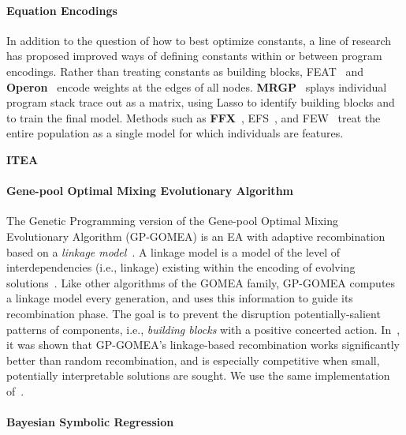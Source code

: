 \paragraph{Equation Encodings}

In addition to the question of how to best optimize constants, a line of research has proposed improved ways of defining constants within or between program encodings. 
Rather than treating constants as building blocks, FEAT~\cite{lacavaLearningConciseRepresentations2019c} and \textbf{Operon}~\cite{burlacuOperonEfficientGenetic2020} encode weights at the edges of all nodes. 
\textbf{MRGP}~\cite{arnaldoMultipleRegressionGenetic2014a} splays individual program stack trace out as a matrix, using Lasso to identify building blocks and to train the final model.
Methods such as \textbf{FFX}~\cite{mcconaghyFFXFastScalable2011}, EFS~\cite{arnaldoBuildingPredictiveModels2015}, and FEW~\cite{lacavaGeneralFeatureEngineering2017} treat the entire population as a single model for which individuals are features.

\textbf{ITEA}

\paragraph{Gene-pool Optimal Mixing Evolutionary Algorithm}

The Genetic Programming version of the Gene-pool Optimal Mixing Evolutionary Algorithm (GP-GOMEA) is an EA with adaptive recombination based on a \emph{linkage model}~\cite{virgolin2017scalable,virgolin2020improving}. 
A linkage model is a model of the level of interdependencies (i.e., linkage) existing within the encoding of evolving solutions~\cite{thierens2011optimal}. 
Like other algorithms of the GOMEA family, GP-GOMEA computes a linkage model every generation, and uses this information to guide its recombination phase. 
The goal is to prevent the disruption potentially-salient patterns of components, i.e., \emph{building blocks} with a positive concerted action.
In~\cite{virgolin2017scalable,virgolin2020improving}, it was shown that GP-GOMEA’s linkage-based recombination works significantly better than random recombination, and is especially competitive when small, potentially interpretable solutions are sought. 
We use the same implementation of~\cite{virgolin2020improving}.

\paragraph{Bayesian Symbolic Regression}

